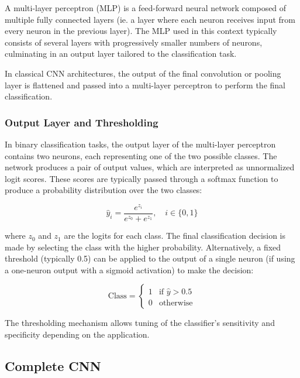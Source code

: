 \documentclass{pracalicmgr}
\begin{document}
A multi-layer perceptron (MLP) is a feed-forward neural network composed of multiple fully connected layers (ie. a layer where each neuron receives input from every neuron in the previous layer). The MLP used in this context typically consists of several layers with progressively smaller numbers of neurons, culminating in an output layer tailored to the classification task.

In classical CNN architectures, the output of the final convolution or pooling layer is flattened and passed into a multi-layer perceptron to perform the final classification.

\subsubsection{Output Layer and Thresholding}

In binary classification tasks, the output layer of the multi-layer perceptron contains two neurons, each representing one of the two possible classes. The network produces a pair of output values, which are interpreted as unnormalized logit scores. These scores are typically passed through a softmax function to produce a probability distribution over the two classes:

\[
\hat{y}_i = \frac{e^{z_i}}{e^{z_0} + e^{z_1}}, \quad i \in \{0, 1\}
\]

where \( z_0 \) and \( z_1 \) are the logits for each class. The final classification decision is made by selecting the class with the higher probability. Alternatively, a fixed threshold (typically 0.5) can be applied to the output of a single neuron (if using a one-neuron output with a sigmoid activation) to make the decision:

\[
\text{Class} = 
\begin{cases}
1 & \text{if } \hat{y} > 0.5 \\
0 & \text{otherwise}
\end{cases}
\]

The thresholding mechanism allows tuning of the classifier's sensitivity and specificity depending on the application.


\subsection{Complete CNN}
\end{document}
